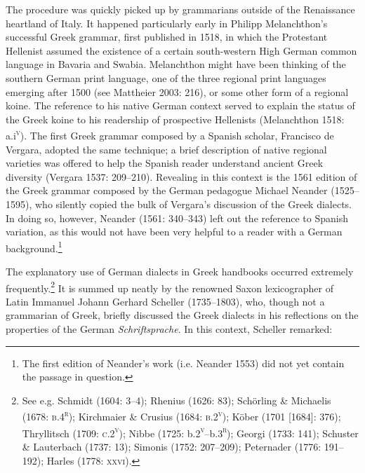 \begin{styleStandard}
The procedure was quickly picked up by grammarians outside of the Renaissance heartland of Italy. It happened particularly early in Philipp Melanchthon’s successful Greek grammar, first published in 1518, in which the Protestant Hellenist assumed the existence of a certain south-western High German common language in Bavaria and Swabia. Melanchthon might have been thinking of the southern German print language, one of the three regional print languages emerging after 1500 (see Mattheier 2003: 216), or some other form of a regional koine. The reference to his native German context served to explain the status of the Greek koine to his readership of prospective Hellenists (Melanchthon 1518: a.i\textsc{\textsuperscript{v}}). The first Greek grammar composed by a Spanish scholar, Francisco de Vergara, adopted the same technique; a brief description of native regional varieties was offered to help the Spanish reader understand ancient Greek diversity (Vergara 1537: 209–210). Revealing in this context is the 1561 edition of the Greek grammar composed by the German pedagogue Michael Neander (1525–1595), who silently copied the bulk of Vergara’s discussion of the Greek dialects. In doing so, however, Neander (1561: 340–343) left out the reference to Spanish variation, as this would not have been very helpful to a reader with a German background.\footnote{ The first edition of Neander’s work (i.e. Neander 1553) did not yet contain the passage in question.}
\end{styleStandard}

\begin{styleStandard}
The explanatory use of German dialects in Greek handbooks occurred extremely frequently.\footnote{ See e.g. Schmidt (1604: 3–4); Rhenius (1626: 83); Schörling \& Michaelis (1678: \textsc{b.4}\textsc{\textsuperscript{r}}); Kirchmaier \& Crusius (1684: \textsc{b.2}\textsc{\textsuperscript{v}}); Köber (1701 [1684]: 376); Thryllitsch (1709: \textsc{c.2}\textsc{\textsuperscript{v}}); Nibbe (1725: b.2\textsc{\textsuperscript{v}}\textsc{–}b.3\textsc{\textsuperscript{r}}); Georgi (1733: 141); Schuster \& Lauterbach (1737: 13); Simonis (1752: 207–209); Peternader (1776: 191–192); Harles (1778: \textsc{xxvi}).} It is summed up neatly by the renowned Saxon lexicographer of Latin Immanuel Johann Gerhard Scheller (1735–1803), who, though not a grammarian of Greek, briefly discussed the Greek dialects in his reflections on the properties of the German \textit{Schriftsprache}. In this context, Scheller remarked:
\end{styleStandard}

